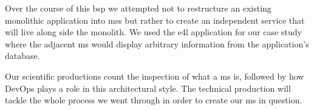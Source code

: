 Over the course of this \gls{bsp} we attempted not to restructure an
existing monolithic application into \glspl{ms} but rather to create
an independent service that will live along side the monolith. We used
the \gls{e4l} application for our case study where the adjacent
\gls{ms} would display arbitrary information from the
application's database.

Our scientific productions count the inspection of what a \gls{ms} is,
followed by how DevOps plays a role in this architectural style. The
technical production will tackle the whole process we went through in
order to create our \gls{ms} in question.




